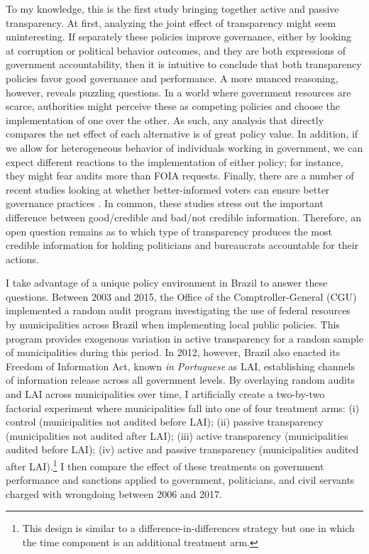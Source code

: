 \documentclass[11pt]{article}
\begin{document}
To my knowledge, this is the first study bringing together active and passive transparency. At first, analyzing the joint effect of transparency might seem uninteresting. If separately these policies improve governance, either by looking at corruption or political behavior outcomes, and they are both expressions of government accountability, then it is intuitive to conclude that both transparency policies favor good governance and performance. A more nuanced reasoning, however, reveals puzzling questions. In a world where government resources are scarce, authorities might perceive these as competing policies and choose the implementation of one over the other. As such, any analysis that directly compares the net effect of each alternative is of great policy value. In addition, if we allow for heterogeneous behavior of individuals working in government, we can expect different reactions to the implementation of either policy; for instance, they might fear audits more than FOIA requests. Finally, there are a number of recent studies looking at whether better-informed voters can ensure better governance practices \citep{PandeCaninformedvoters2011,WintersLackingInformationCondoning2013,ChongDoesCorruptionInformation2015,Weitz-ShapiroCanCitizensDiscern2017}. In common, these studies stress out the important difference between good/credible and bad/not credible information. Therefore, an open question remains as to which type of transparency produces the most credible information for holding politicians and bureaucrats accountable for their actions.

I take advantage of a unique policy environment in Brazil to answer these questions. Between 2003 and 2015, the Office of the Comptroller-General (CGU) implemented a random audit program investigating the use of federal resources by municipalities across Brazil when implementing local public policies. This program provides exogenous variation in active transparency for a random sample of municipalities during this period. In 2012, however, Brazil also enacted its Freedom of Information Act, known  \emph{in Portuguese} as LAI, establishing channels of information release across all government levels. By overlaying random audits and LAI across municipalities over time, I artificially create a two-by-two factorial experiment where municipalities fall into one of four treatment arms: (i) control (municipalities not audited before LAI); (ii) passive transparency (municipalities not audited after LAI); (iii) active transparency (municipalities audited before LAI); (iv) active and passive transparency (municipalities audited after LAI).\footnote{This design is similar to a difference-in-differences strategy but one in which the time component is an additional treatment arm.} I then compare the effect of these treatments on government performance and sanctions applied to government, politicians, and civil servants charged with wrongdoing between 2006 and 2017.
\end{document}
